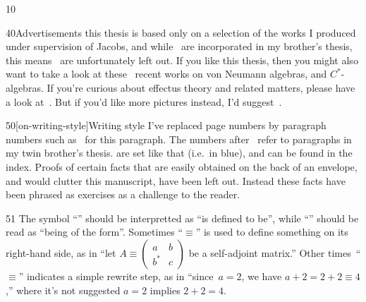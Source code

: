 \documentclass[b5paper]{book}
\begin{document}
\begin{parsec}{10}
\begin{point}{40}{Advertisements}
this thesis is based only on a selection
\cite{model,cho2015quotient,cho2016duplicable,qpakm,westerbaan2016universal}
of the works
I produced under supervision of Jacobs,
and while~\cite{wwpaschke,effintro,statesofconvexsets}
are incorporated in my brother's thesis,
this means~\cite{jacobs2015effect,jacobs2017distances} 
are unfortunately left out.
If you like this thesis,
then
you might also want to take a look
at these~\cite{rennela2017infinite,
rennela2015complete,
furber2013kleisli,
kornell2012,
heunen2015domains,
Maassen2010} recent works on von Neumann algebras,
and $C^*$-algebras.
If you're curious
about effectus theory
and related matters,
please have a look at~\cite{jacobs2017quantum,
cho2017disintegration,
jacobs2016hyper,
jacobs2017channel,
jacobs2017formal,
cho2017efprob,
jacobs2017probability,
jacobs2017recipe,
jacobs2016effectuses,
jacobs2016affine,
jacobs2016relating,
effintro,
statesofconvexsets,
cho2015quotient,
jacobs2017distances,
jacobs2015effect,
jacobs2016expectation,
jacobs2016predicate,
newdirections}.
But if you'd like more pictures instead,
I'd suggest~\cite{coecke2017picturing}.
\end{point}
\begin{point}{50}[on-writing-style]{Writing style}
I've replaced page numbers by
paragraph numbers
such as~
for this paragraph.
The numbers after~ refer to paragraphs
	in my twin brother's thesis\cite{bas}.
 are set like that
(i.e.~in blue),
and can be found in the index.
Proofs of certain facts
that are easily obtained on the back of an envelope,
and would clutter this manuscript,
have been left out.
Instead these facts have been phrased as exercises
as a challenge to the reader.
\end{point}
\begin{point}{51}
    The symbol ``\Define{$:=$}''
should be interpretted as ``is defined to be'',
    while ``\Define{$\equiv$}''
should be read as ``being of the form''.
Sometimes ``$\equiv$'' is
used to define something on its right-hand side,
as in ``let $A\equiv\left(
\begin{smallmatrix} a&b\\b^* &c\end{smallmatrix}
\right)$ be a self-adjoint matrix.''
Other times~``$\equiv$''
indicates a simple rewrite step, as in
``since~$a=2$, we have $a+2=2+2\equiv 4$,''
where it's not suggested $a=2$ implies $2+2=4$.
\end{point}

\end{parsec}
\end{document}
